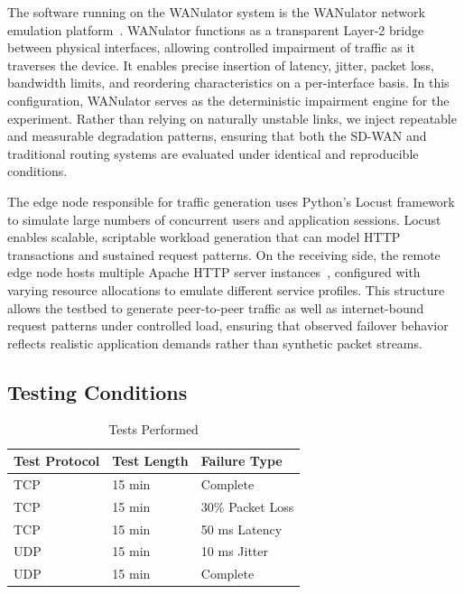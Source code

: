 \documentclass[conference]{IEEEtran}
\begin{document}
The software running on the WANulator system is the WANulator network emulation platform~\cite{wanulator_home}. WANulator functions as a transparent Layer-2 bridge between physical interfaces, allowing controlled impairment of traffic as it traverses the device. It enables precise insertion of latency, jitter, packet loss, bandwidth limits, and reordering characteristics on a per-interface basis. In this configuration, WANulator serves as the deterministic impairment engine for the experiment. Rather than relying on naturally unstable links, we inject repeatable and measurable degradation patterns, ensuring that both the SD-WAN and traditional routing systems are evaluated under identical and reproducible conditions.

The edge node responsible for traffic generation uses Python’s Locust framework~\cite{locust_home} to simulate large numbers of concurrent users and application sessions. Locust enables scalable, scriptable workload generation that can model HTTP transactions and sustained request patterns. On the receiving side, the remote edge node hosts multiple Apache HTTP server instances~\cite{apache_httpd}, configured with varying resource allocations to emulate different service profiles. This structure allows the testbed to generate peer-to-peer traffic as well as internet-bound request patterns under controlled load, ensuring that observed failover behavior reflects realistic application demands rather than synthetic packet streams.

\subsection{Testing Conditions}

\begin{table}[tbp]
\renewcommand{\arraystretch}{1.2} 
\centering
\caption{Tests Performed}
\begin{tabularx}{\linewidth}{@{}lXX@{}} \toprule
\textbf{Test Protocol} & \textbf{Test Length} & \textbf{Failure Type} \\ \midrule
TCP & 15 min    & Complete \\
TCP & 15 min    & 30\% Packet Loss \\
TCP & 15 min    & 50 ms Latency \\
UDP & 15 min    & 10 ms Jitter \\
UDP & 15 min    & Complete \\ \bottomrule
\end{tabularx}
\label{tests}
\end{table}
\end{document}
